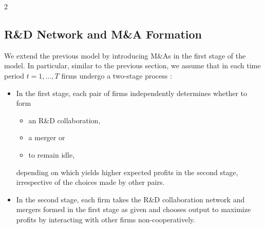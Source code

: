 \documentclass[12pt]{article}
\begin{document}
\begin{spacing}{2}
\subsection{R\&D Network and M\&A Formation}
\label{sec:dyn-rnd-mna}
We extend the previous model by introducing M\&As in the first stage of the model. In particular, similar to the previous section, we assume that in each time period $t=1,\ldots,T$ firms undergo a two-stage process \citep{phillips2013r,hsieh2020specification}:
\begin{itemize}
\item In the first stage, each pair of firms independently determines whether to form 
\begin{itemize}
\item[(i)] an R\&D collaboration, 
\item[(ii)] a merger or 
\item[(iii)] to remain idle, 
\end{itemize}
depending on which yields higher expected profits in the second stage, irrespective of the choices made by other pairs. 
\item In the second stage, each firm takes the R\&D collaboration network and mergers formed in the first stage as given and chooses output to maximize profits by interacting with other firms non-cooperatively. 
\end{itemize}


\end{spacing}
\end{document}
